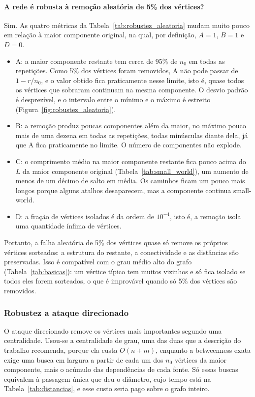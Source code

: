 \paragraph{A rede é robusta à remoção aleatória de 5\% dos vértices?} Sim. As quatro métricas da Tabela~\ref{tab:robustez_aleatoria} mudam muito pouco em relação à maior componente original, na qual, por definição, $A = 1$, $B = 1$ e $D = 0$.
\begin{itemize}
  \item A: a maior componente restante tem cerca de 95\% de $n_0$ em todas as repetições. Como 5\% dos vértices foram removidos, A não pode passar de $1 - r/n_0$, e o valor obtido fica praticamente nesse limite, isto é, quase todos os vértices que sobraram continuam na mesma componente. O desvio padrão é desprezível, e o intervalo entre o mínimo e o máximo é estreito (Figura~\ref{fig:robustez_aleatoria}).
  \item B: a remoção produz poucas componentes além da maior, no máximo pouco mais de uma dezena em todas as repetições, todas minúsculas diante dela, já que A fica praticamente no limite. O número de componentes não explode.
  \item C: o comprimento médio na maior componente restante fica pouco acima do $L$ da maior componente original (Tabela~\ref{tab:small_world}), um aumento de menos de um décimo de salto em média. Os caminhos ficam um pouco mais longos porque alguns atalhos desaparecem, mas a componente continua small-world.
  \item D: a fração de vértices isolados é da ordem de $10^{-4}$, isto é, a remoção isola uma quantidade ínfima de vértices.
\end{itemize}
Portanto, a falha aleatória de 5\% dos vértices quase só remove os próprios vértices sorteados: a estrutura do restante, a conectividade e as distâncias são preservadas. Isso é compatível com o grau médio alto do grafo (Tabela~\ref{tab:basicas}): um vértice típico tem muitos vizinhos e só fica isolado se todos eles forem sorteados, o que é improvável quando só 5\% dos vértices são removidos.

\subsubsection{Robustez a ataque direcionado}

O ataque direcionado remove os vértices mais importantes segundo uma centralidade. Usou-se a centralidade de grau, uma das duas que a descrição do trabalho recomenda, porque ela custa $O(n + m)$, enquanto a betweenness exata exige uma busca em largura a partir de cada um dos $n_0$ vértices da maior componente, mais o acúmulo das dependências de cada fonte. Só essas buscas equivalem à passagem única que deu o diâmetro, cujo tempo está na Tabela~\ref{tab:distancias}, e esse custo seria pago sobre o grafo inteiro.

